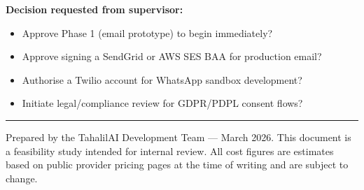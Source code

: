 \documentclass[12pt,a4paper]{article}
\begin{document}
\vspace{1em}
\noindent\textbf{Decision requested from supervisor:}

\begin{itemize}[leftmargin=2em]
    \item Approve Phase 1 (email prototype) to begin immediately?
    \item Approve signing a SendGrid or AWS SES BAA for production email?
    \item Authorise a Twilio account for WhatsApp sandbox development?
    \item Initiate legal/compliance review for GDPR/PDPL consent flows?
\end{itemize}

\vspace{2em}
\hrule
\vspace{0.8em}
{\small\color{gray}
Prepared by the TahalilAI Development Team --- March 2026.
This document is a feasibility study intended for internal review.
All cost figures are estimates based on public provider pricing pages
at the time of writing and are subject to change.
}
\end{document}

